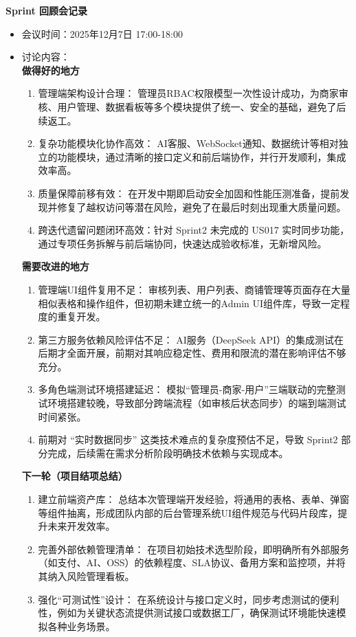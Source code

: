 \begin{levellist}
    \item \textbf{Sprint 回顾会记录}
    \begin{itemize}
        \item 会议时间：2025年12月7日 17:00-18:00
        \item 讨论内容：\\
              \textbf{做得好的地方}
              \begin{enumerate}
                  \item 管理端架构设计合理： 管理员RBAC权限模型一次性设计成功，为商家审核、用户管理、数据看板等多个模块提供了统一、安全的基础，避免了后续返工。
                  \item 复杂功能模块化协作高效： AI客服、WebSocket通知、数据统计等相对独立的功能模块，通过清晰的接口定义和前后端协作，并行开发顺利，集成效率高。
                  \item 质量保障前移有效： 在开发中期即启动安全加固和性能压测准备，提前发现并修复了越权访问等潜在风险，避免了在最后时刻出现重大质量问题。
                  \item 跨迭代遗留问题闭环高效：针对 Sprint2 未完成的 US017 实时同步功能，通过专项任务拆解与前后端协同，快速达成验收标准，无新增风险。
              \end{enumerate}
              \textbf{需要改进的地方}
              \begin{enumerate}
                  \item 管理端UI组件复用不足： 审核列表、用户列表、商铺管理等页面存在大量相似表格和操作组件，但初期未建立统一的Admin UI组件库，导致一定程度的重复开发。
                  \item 第三方服务依赖风险评估不足： AI服务（DeepSeek API）的集成测试在后期才全面开展，前期对其响应稳定性、费用和限流的潜在影响评估不够充分。
                  \item 多角色端测试环境搭建延迟： 模拟“管理员-商家-用户”三端联动的完整测试环境搭建较晚，导致部分跨端流程（如审核后状态同步）的端到端测试时间紧张。
                  \item 前期对 “实时数据同步” 这类技术难点的复杂度预估不足，导致 Sprint2 部分完成，后续需在需求分析阶段明确技术依赖与实现成本。
              \end{enumerate}
              \textbf{下一轮（项目结项总结）}
              \begin{enumerate}
                  \item 建立前端资产库： 总结本次管理端开发经验，将通用的表格、表单、弹窗等组件抽离，形成团队内部的后台管理系统UI组件规范与代码片段库，提升未来开发效率。
                  \item 完善外部依赖管理清单： 在项目初始技术选型阶段，即明确所有外部服务（如支付、AI、OSS）的依赖程度、SLA协议、备用方案和监控项，并将其纳入风险管理看板。
                  \item 强化“可测试性”设计： 在系统设计与接口定义时，同步考虑测试的便利性，例如为关键状态流提供测试接口或数据工厂，确保测试环境能快速模拟各种业务场景。
              \end{enumerate}


\end{itemize}
\end{levellist}
